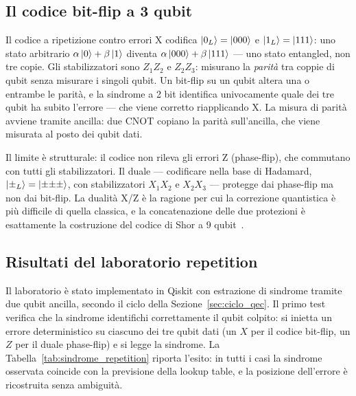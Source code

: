 \begin{onehalfspace}
\subsection{Il codice bit-flip a 3 qubit}

Il codice a ripetizione contro errori X codifica $\ket{0_L} = \ket{000}$ e $\ket{1_L} = \ket{111}$: uno stato arbitrario $\alpha\ket{0} + \beta\ket{1}$ diventa $\alpha\ket{000} + \beta\ket{111}$ --- uno stato entangled, non tre copie. Gli stabilizzatori sono $Z_1 Z_2$ e $Z_2 Z_3$: misurano la \emph{parità} tra coppie di qubit senza misurare i singoli qubit. Un bit-flip su un qubit altera una o entrambe le parità, e la sindrome a 2 bit identifica univocamente quale dei tre qubit ha subito l'errore --- che viene corretto riapplicando X. La misura di parità avviene tramite ancilla: due CNOT copiano la parità sull'ancilla, che viene misurata al posto dei qubit dati.

Il limite è strutturale: il codice non rileva gli errori Z (phase-flip), che commutano con tutti gli stabilizzatori. Il duale --- codificare nella base di Hadamard, $\ket{\pm_L} = \ket{{\pm}{\pm}{\pm}}$, con stabilizzatori $X_1 X_2$ e $X_2 X_3$ --- protegge dai phase-flip ma non dai bit-flip. La dualità X/Z è la ragione per cui la correzione quantistica è più difficile di quella classica, e la concatenazione delle due protezioni è esattamente la costruzione del codice di Shor a 9 qubit~\cite{shorcorrection1995}.

\subsection{Risultati del laboratorio repetition}
\label{subsec:risultati_repetition}

Il laboratorio è stato implementato in Qiskit con estrazione di sindrome tramite due qubit ancilla, secondo il ciclo della Sezione~\ref{sec:ciclo_qec}. Il primo test verifica che la sindrome identifichi correttamente il qubit colpito: si inietta un errore deterministico su ciascuno dei tre qubit dati (un $X$ per il codice bit-flip, un $Z$ per il duale phase-flip) e si legge la sindrome. La Tabella~\ref{tab:sindrome_repetition} riporta l'esito: in tutti i casi la sindrome osservata coincide con la previsione della lookup table, e la posizione dell'errore è ricostruita senza ambiguità.


\end{onehalfspace}
